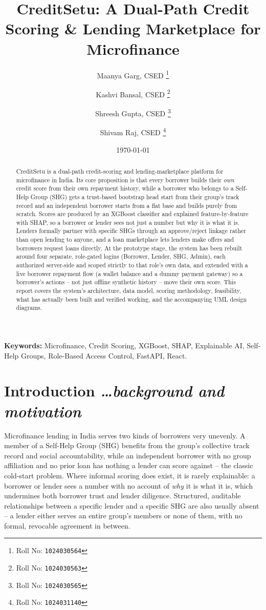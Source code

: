\documentclass[11pt,a4paper]{article}
\title{CreditSetu: A Dual-Path Credit Scoring \& Lending Marketplace for Microfinance}
\author{
  Maanya Garg, CSED%
  \thanks{Roll No: \texttt{1024030564}}
  \and
  Kashvi Bansal, CSED%
  \thanks{Roll No: \texttt{1024030563}}
  \and
  Shreesh Gupta, CSED%
  \thanks{Roll No: \texttt{1024030565}}
  \and
  Shivam Raj, CSED%
  \thanks{Roll No: \texttt{1024031140}}
}
\date{\today}
\newcommand{\BvrHint}[1]{%
  {\normalfont\normalsize\itshape\hfill #1}}
\begin{document}
\maketitle

\begin{abstract}
CreditSetu is a dual-path credit-scoring and lending-marketplace
platform for microfinance in India. Its core proposition is that every
borrower builds their \emph{own} credit score from their own repayment
history, while a borrower who belongs to a Self-Help Group (SHG) gets a
trust-based bootstrap head start from their group's track record and an
independent borrower starts from a flat base and builds purely from
scratch. Scores are produced by an XGBoost classifier and explained
feature-by-feature with SHAP, so a borrower or lender sees not just a
number but why it is what it is. Lenders formally partner with specific
SHGs through an approve/reject linkage rather than open lending to
anyone, and a loan marketplace lets lenders make offers and borrowers
request loans directly. At the prototype stage, the system has been
rebuilt around four separate, role-gated logins (Borrower, Lender, SHG,
Admin), each authorized server-side and scoped strictly to that role's
own data, and extended with a live borrower repayment flow (a wallet
balance and a dummy payment gateway) so a borrower's actions -- not
just offline synthetic history -- move their own score. This report
covers the system's architecture, data model, scoring methodology,
feasibility, what has actually been built and verified working, and
the accompanying UML design diagrams.
\end{abstract}

\textbf{Keywords:} Microfinance, Credit Scoring, XGBoost, SHAP,
Explainable AI, Self-Help Groups, Role-Based Access Control, FastAPI,
React.

\section{Introduction%
\BvrHint{\ldots background and motivation}}

Microfinance lending in India serves two kinds of borrowers very
unevenly. A member of a Self-Help Group (SHG) benefits from the
group's collective track record and social accountability, while an
independent borrower with no group affiliation and no prior loan has
nothing a lender can score against -- the classic cold-start problem.
Where informal scoring does exist, it is rarely explainable: a
borrower or lender sees a number with no account of \emph{why} it is
what it is, which undermines both borrower trust and lender diligence.
Structured, auditable relationships between a specific lender and a
specific SHG are also usually absent -- a lender either serves an
entire group's members or none of them, with no formal, revocable
agreement in between.
\end{document}
